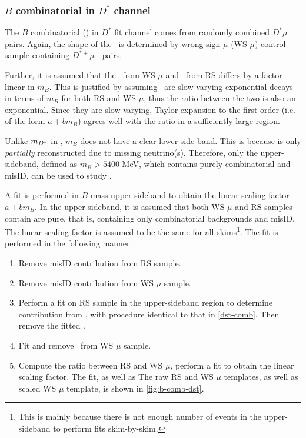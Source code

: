 \subsubsection{$B$ combinatorial in $D^*$ channel}
\label{b-comb-dst}

The $B$ combinatorial (\BComb) in $D^*$ fit channel comes from randomly
combined $D^* \mu$ pairs.
Again, the shape of the \BComb\ is determined by wrong-sign $\mu$ (WS $\mu$)
control sample containing $D^{*+} \mu^+$ pairs.

Further, it is assumed that the \BComb\ from WS $\mu$ and \BComb\ from RS
differs by a factor linear in $m_B$.
This is justified by assuming \BComb\ are slow-varying exponential decays in
terms of $m_B$ for both RS and WS $\mu$, thus the ratio between the two is also
an exponential.
Since they are slow-varying, Taylor expansion to the first order (i.e. of the
form $a + b m_B$) agrees well with the ratio in a sufficiently large region.

Unlike $m_{{D}^*}$ in \DstComb,
$m_B$ does not have a clear lower side-band.
This is because \B is only \emph{partially} reconstructed
due to missing neutrino(s).
Therefore, only the upper-sideband, defined as $m_B > 5400$ MeV,
which contains purely combinatorial and misID, can be used to
study \BComb.

A fit is performed in $B$ mass upper-sideband  to obtain
the linear scaling factor $a + b m_B$.
In the upper-sideband, it is assumed that both WS $\mu$ and RS samples contain
are pure, that is, containing only combinatorial backgrounds and misID.
The linear scaling factor is assumed to be the same for all skims\footnote{
    This is mainly because there is not enough number of events in the
    upper-sideband to perform fits skim-by-skim.
}.
The fit is performed in the following manner:

\begin{enumerate}
    \item Remove misID contribution from RS sample.
    \item Remove misID contribution from WS $\mu$ sample.
    \item Perform a fit on RS sample in the upper-sideband region to determine
        contribution from \DstComb, with procedure identical to that in
        \cref{dst-comb}.
        Then remove the fitted \DstComb.
    \item Fit and remove \DstComb\ from WS $\mu$ sample.
    \item Compute the ratio between RS and WS $\mu$, perform a fit to obtain
        the linear scaling factor.
        The fit, as well as
        The raw RS and WS $\mu$ templates, as well as scaled WS $\mu$
        template, is shown in \cref{fig:b-comb-dst}.
\end{enumerate}

